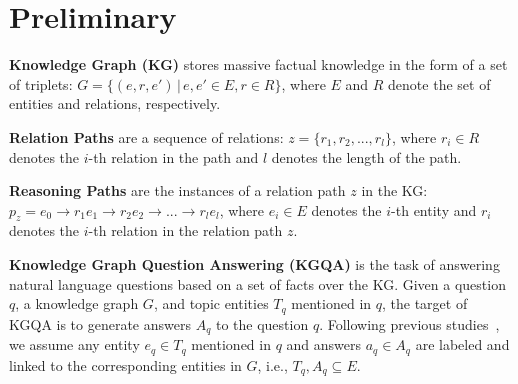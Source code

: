 \documentclass{article}
\begin{document}


\vspace{-1mm}
\section{Preliminary}
\vspace{-2mm}
\textbf{Knowledge Graph (KG)} stores massive factual knowledge in the form of a set of triplets: $G = \{(e, r, e') \, | \, e, e' \in E, r \in R\}$, where $E$ and $R$ denote the set of entities and relations, respectively. 

\textbf{Relation Paths} are a sequence of relations: $z = \{r_1, r_2, ..., r_l\}$, where $r_i \in R$ denotes the $i$-th relation in the path and $l$ denotes the length of the path. 


\textbf{Reasoning Paths} are the instances of a relation path $z$ in the KG: $p_z = e_0 \rightarrow r_1e_1 \rightarrow r_2e_2 \rightarrow... \rightarrow r_l e_l$, where $e_i \in E$ denotes the $i$-th entity and $r_i$ denotes the $i$-th relation in the relation path $z$.

\textbf{Knowledge Graph Question Answering (KGQA)} 
is the task of answering natural language questions based on a set of facts over the KG.
Given a question $q$, a knowledge graph $G$, and topic entities $T_q$ mentioned in $q$, the target of KGQA is to generate answers $A_q$ to the question $q$.
Following previous studies~\cite{sun2024think}, 
we assume any entity $e_q \in T_q$ mentioned in $q$ and answers $a_q \in A_q$ are labeled and linked to the corresponding entities in $G$, i.e., $T_q, A_q \subseteq E$.
\end{document}
